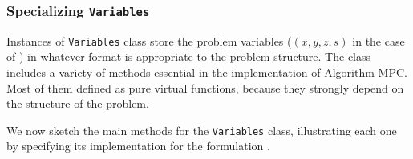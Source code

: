 
\subsubsection{Specializing {\tt Variables}}
\label{sec:variablesclass}

Instances of {\tt Variables} class store the problem variables
($(x,y,z,s)$ in the case of ) in whatever format is
appropriate to the problem structure. The class includes a variety of
methods essential in the implementation of Algorithm MPC. Most of them
defined as pure virtual functions, because they strongly depend on the
structure of the problem.

We now sketch the main methods for the {\tt Variables} class,
illustrating each one by specifying its implementation for the
formulation .

